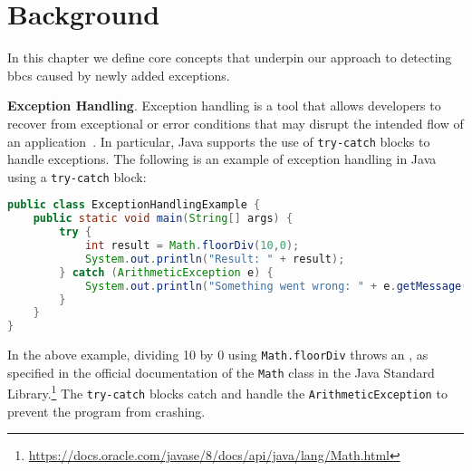 \chapter{Background}\label{background}

In this chapter we define core concepts that underpin our approach to detecting
\gls{bbc}s caused by newly added exceptions.

\textbf{Exception Handling}. Exception handling is a tool that allows developers to recover from
exceptional or error conditions that may disrupt the intended flow of an application~\cite{Suman2016exception}.
In particular, Java supports the use of \texttt{try-catch} blocks to handle exceptions.
The following is an example of exception handling in Java using a \texttt{try-catch}
block:

\begin{lstlisting}[language=java]
public class ExceptionHandlingExample {
    public static void main(String[] args) {
        try {
            int result = Math.floorDiv(10,0);
            System.out.println("Result: " + result);
        } catch (ArithmeticException e) {
            System.out.println("Something went wrong: " + e.getMessage());
        }
    }
}
\end{lstlisting}

In the above example, dividing 10 by 0 using \texttt{Math.floorDiv} throws an
\texttt{}, as specified in the official documentation of the
\texttt{Math} class in the Java Standard Library.\footnote{\url{https://docs.oracle.com/javase/8/docs/api/java/lang/Math.html}}
The \texttt{try-catch} blocks catch and handle the \texttt{ArithmeticException}
to prevent the program from crashing.




